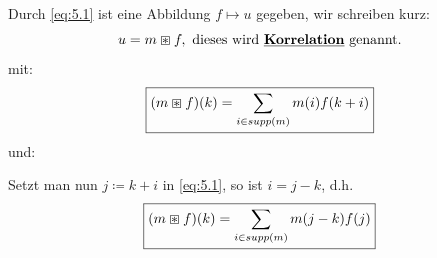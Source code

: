 \documentclass{article}
\theoremstyle{plain}
\theoremstyle{definition}
\numberwithin{equation}{section}
\newcommand{\mim}[1] {
\underline{\textbf{#1\index{#1}}}
}
\begin{document}
        Durch \eqref{eq:5.1} ist eine Abbildung $f \mapsto u$ gegeben, wir schreiben kurz:
        \[u = m \boxast f, \ \text{dieses wird \mim{Korrelation} genannt.}\]
        mit:
        \begin{equation}\label{eq:5.3}
            \framebox{$\displaystyle (m \boxast f)(k) = \sum_{i \in supp(m)} m(i) f(k+i)$}
        \end{equation}
        und:
        \begin{center}
        \end{center}

        Setzt man nun $j \coloneqq  k + i$ in \eqref{eq:5.1}, so ist $i=j-k$, d.h.
        \begin{equation}\label{eq:5.4}
            \framebox{$\displaystyle (m \boxast f)(k) = \sum_{i \in supp(m)} m(j-k) f(j)$}
        \end{equation}
\end{document}
